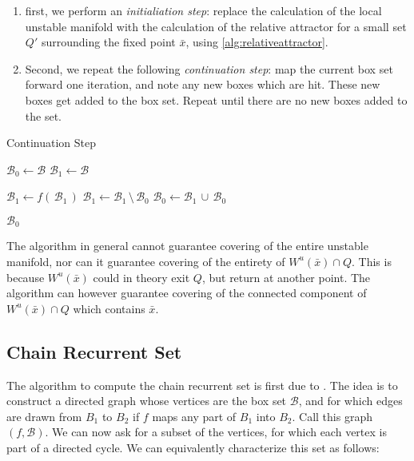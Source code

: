 \begin{enumerate}
    \item first, we perform an \emph{initialiation step}: replace the calculation of 
    the local unstable manifold with the calculation of the relative
    attractor for a small set $Q'$ surrounding the fixed point $\bar{x}$, using 
    \autoref{alg:relativeattractor}. 
    \item Second, we repeat the following \emph{continuation step}: map 
    the current box set forward one iteration, and note any new boxes which are hit. These 
    new boxes get added to the box set. Repeat until there are no new boxes
    added to the set. 
\end{enumerate}

\begin{algorithm}
    \caption{Continuation Step}
    \label{alg:manifold}

    \begin{algorithmic}[1]
        \State $\mathcal{B}_0 \gets \mathcal{B}$
        \State $\mathcal{B}_1 \gets \mathcal{B}$

            \State $\mathcal{B}_1 \gets f(\,\mathcal{B}_1\,)$
            \State $\mathcal{B}_1 \gets \mathcal{B}_1\, \setminus\, \mathcal{B}_0$
            \State $\mathcal{B}_0 \gets \mathcal{B}_1\, \cup\, \mathcal{B}_0$
        \EndWhile

        \State \Return $\mathcal{B}_0$
    \end{algorithmic}
\end{algorithm}

\begin{proposition}
    \cite*{manifold} The algorithm in general cannot guarantee covering of the 
    entire unstable manifold, nor can it guarantee covering of the entirety of 
    $W^u(\bar{x}) \cap Q$. This is because $W^u(\bar{x})$ could in theory exit $Q$, 
    but return at another point. The algorithm can however guarantee covering 
    of the connected component of $W^u(\bar{x}) \cap Q$ which contains $\bar{x}$.
\end{proposition}
    

\subsection{Chain Recurrent Set}

The algorithm to compute the chain recurrent set is first due to \cite*{chain}. The idea 
is to construct a directed graph whose vertices are the box set $\mathcal{B}$, and for 
which edges are drawn from $B_1$ to $B_2$ if $f$ maps any part of $B_1$ into $B_2$. 
Call this graph $(f, \mathcal{B})$. We can now ask for a subset of the 
vertices, for which each vertex is part of a directed cycle. We can equivalently 
characterize this set as follows:

